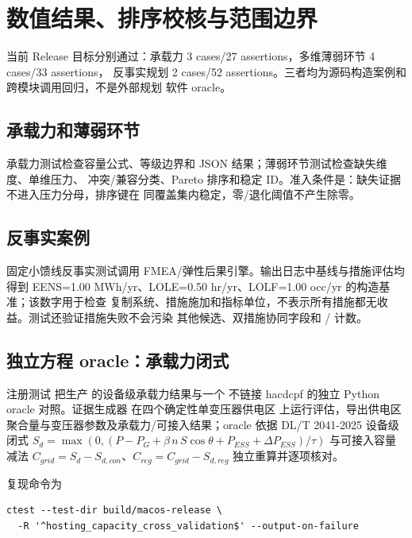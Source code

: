 \section{数值结果、排序校核与范围边界}\label{sec:analysis-numerical}

当前 Release 目标分别通过：承载力 3 cases/27 assertions，多维薄弱环节 4 cases/33 assertions，
反事实规划 2 cases/52 assertions。三者均为源码构造案例和跨模块调用回归，不是外部规划
软件 oracle。

\subsection{承载力和薄弱环节}
承载力测试检查容量公式、等级边界和 JSON 结果；薄弱环节测试检查缺失维度、单维压力、
冲突/兼容分类、Pareto 排序和稳定 ID。准入条件是：缺失证据不进入压力分母，排序键在
同覆盖集内稳定，零/退化阈值不产生除零。

\subsection{反事实案例}
固定小馈线反事实测试调用 FMEA/弹性后果引擎。输出日志中基线与措施评估均得到
EENS=1.00 MWh/yr、LOLE=0.50 hr/yr、LOLF=1.00 occ/yr 的构造基准；该数字用于检查
复制系统、措施施加和指标单位，不表示所有措施都无收益。测试还验证措施失败不会污染
其他候选、双措施协同字段和 / 计数。

\subsection{独立方程 oracle：承载力闭式}\label{sec:analysis-hc-xref}
注册测试  把生产
 的设备级承载力结果与一个
不链接 hacdcpf 的独立 Python oracle 对照。证据生成器
 在四个确定性单变压器供电区
上运行评估，导出供电区聚合量与变压器参数及承载力/可接入结果；oracle
 依据 DL/T 2041-2025 设备级闭式
$S_d=\max(0,(P-P_G+\beta\, n\, S\cos\theta+P_{ESS}+\Delta P_{ESS})/\tau)$ 与可接入容量减法
$C_{grid}=S_d-S_{d,con}$、$C_{reg}=C_{grid}-S_{d,reg}$ 独立重算并逐项核对。

复现命令为
\begin{verbatim}
ctest --test-dir build/macos-release \
  -R '^hosting_capacity_cross_validation$' --output-on-failure
\end{verbatim}

